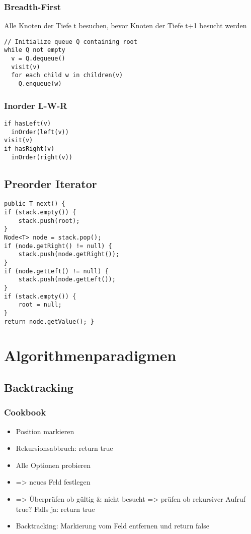 \begin{multicols*}{5}
		\subsubsection{Breadth-First}
		Alle Knoten der Tiefe t besuchen, bevor Knoten der Tiefe t+1 besucht werden
			\begin{lstlisting}
// Initialize queue Q containing root
while Q not empty
  v = Q.dequeue()
  visit(v)
  for each child w in children(v)
    Q.enqueue(w)
			\end{lstlisting}
		
		\subsubsection{Inorder L-W-R}
			\begin{lstlisting}
if hasLeft(v)
  inOrder(left(v))
visit(v)
if hasRight(v)
  inOrder(right(v))
			\end{lstlisting}

	\subsection{Preorder Iterator}
		\begin{lstlisting}
public T next() {
if (stack.empty()) {
	stack.push(root);
}
Node<T> node = stack.pop();
if (node.getRight() != null) {
	stack.push(node.getRight());
}
if (node.getLeft() != null) {
	stack.push(node.getLeft());
}
if (stack.empty()) {
	root = null;
}
return node.getValue(); }
		\end{lstlisting}


\section{Algorithmenparadigmen}
	\subsection{Backtracking}
		\subsubsection{Cookbook}
			\begin{itemize}
				\item Position markieren
				\item Rekursionsabbruch: return true
				\item Alle Optionen probieren
					\item => neues Feld festlegen
					\item => Überprüfen ob gültig \& nicht besucht
					\subitem => prüfen ob rekursiver Aufruf true? 
					\subitem Falls ja: return true
				\item Backtracking: Markierung vom Feld entfernen und return false
			\end{itemize}			
		

\end{multicols*}
